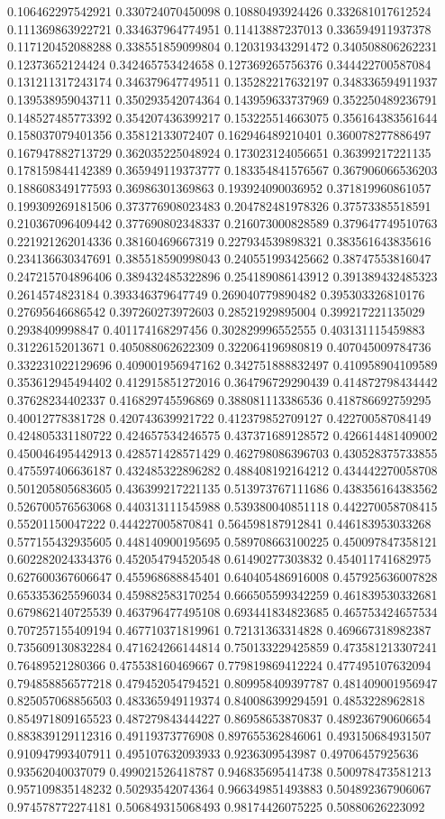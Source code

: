 \begin{table}
\begin{tabu}
\begin{sparkline}{10}
0.106462297542921 0.330724070450098 0.10880493924426 0.332681017612524 0.111369863922721 0.334637964774951 0.11413887237013 0.336594911937378 0.117120452088288 0.338551859099804 0.120319343291472 0.340508806262231 0.12373652124424 0.342465753424658 0.127369265756376 0.344422700587084 0.131211317243174 0.346379647749511 0.135282217632197 0.348336594911937 0.139538959043711 0.350293542074364 0.143959633737969 0.352250489236791 0.148527485773392 0.354207436399217 0.153225514663075 0.356164383561644 0.158037079401356 0.35812133072407 0.162946489210401 0.360078277886497 0.167947882713729 0.362035225048924 0.173023124056651 0.36399217221135 0.178159844142389 0.365949119373777 0.183354841576567 0.367906066536203 0.188608349177593 0.36986301369863 0.193924090036952 0.371819960861057 0.199309269181506 0.373776908023483 0.204782481978326 0.37573385518591 0.210367096409442 0.377690802348337 0.216073000828589 0.379647749510763 0.221921262014336 0.38160469667319 0.227934539898321 0.383561643835616 0.234136630347691 0.385518590998043 0.240551993425662 0.38747553816047 0.247215704896406 0.389432485322896 0.254189086143912 0.391389432485323 0.2614574823184 0.393346379647749 0.269040779890482 0.395303326810176 0.27695646686542 0.397260273972603 0.28521929895004 0.399217221135029 0.2938409998847 0.401174168297456 0.302829996552555 0.403131115459883 0.31226152013671 0.405088062622309 0.322064196980819 0.407045009784736 0.332231022129696 0.409001956947162 0.342751888832497 0.410958904109589 0.353612945494402 0.412915851272016 0.364796729290439 0.414872798434442 0.37628234402337 0.416829745596869 0.388081113386536 0.418786692759295 0.40012778381728 0.420743639921722 0.412379852709127 0.422700587084149 0.424805331180722 0.424657534246575 0.437371689128572 0.426614481409002 0.450046495442913 0.428571428571429 0.462798086396703 0.430528375733855 0.475597406636187 0.432485322896282 0.488408192164212 0.434442270058708 0.501205805683605 0.436399217221135 0.513973767111686 0.438356164383562 0.526700576563068 0.440313111545988 0.539380040851118 0.442270058708415 0.55201150047222 0.444227005870841 0.564598187912841 0.446183953033268 0.577155432935605 0.448140900195695 0.589708663100225 0.450097847358121 0.602282024334376 0.452054794520548 0.61490277303832 0.454011741682975 0.627600367606647 0.455968688845401 0.640405486916008 0.457925636007828 0.653353625596034 0.459882583170254 0.666505599342259 0.461839530332681 0.679862140725539 0.463796477495108 0.693441834823685 0.465753424657534 0.707257155409194 0.467710371819961 0.72131363314828 0.469667318982387 0.735609130832284 0.471624266144814 0.750133229425859 0.473581213307241 0.76489521280366 0.475538160469667 0.779819869412224 0.477495107632094 0.794858856577218 0.479452054794521 0.809958409397787 0.481409001956947 0.825057068856503 0.483365949119374 0.840086399294591 0.4853228962818 0.854971809165523 0.487279843444227 0.86958653870837 0.489236790606654 0.883839129112316 0.49119373776908 0.897655362846061 0.493150684931507 0.910947993407911 0.495107632093933 0.9236309543987 0.49706457925636 0.93562040037079 0.499021526418787 0.946835695414738 0.500978473581213 0.957109835148232 0.50293542074364 0.966349851493883 0.504892367906067 0.974578772274181 0.506849315068493 0.98174426075225 0.50880626223092 
\end{sparkline}
\end{tabu}
\end{table}
